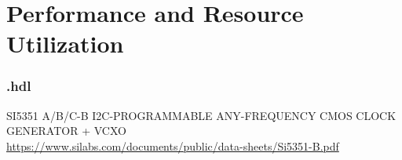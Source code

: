 \section*{Performance and Resource Utilization}
\subsubsection*{\comp.hdl}

\begin{thebibliography}{1}

 SI5351 A/B/C-B I2C-PROGRAMMABLE ANY-FREQUENCY CMOS CLOCK GENERATOR + VCXO \\
\url{https://www.silabs.com/documents/public/data-sheets/Si5351-B.pdf}


\end{thebibliography}


